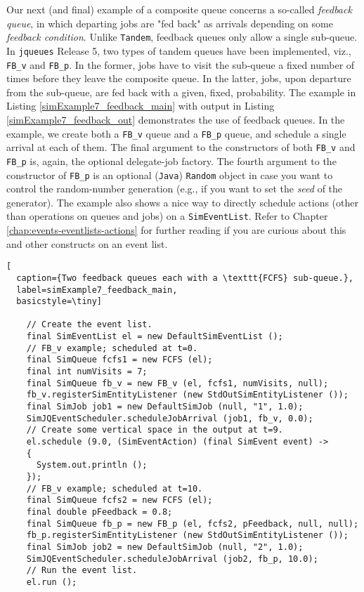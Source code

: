 Our next (and final) example of a composite queue
  concerns a so-called {\em feedback queue},
  in which departing jobs are "fed back"
  as arrivals depending on some {\em feedback condition}.
Unlike \lstinline|Tandem|,
  feedback queues only allow a single sub-queue.
In \lstinline|jqueues| Release 5,
  two types of tandem queues have been implemented,
  viz., \lstinline|FB_v| and \lstinline|FB_p|.
In the former, jobs have to visit the sub-queue a fixed number
  of times before they leave the composite queue.
In the latter, jobs, upon departure from the sub-queue,
  are fed back with a given, fixed, probability.
The example in Listing \ref{simExample7_feedback_main}
  with output in Listing \ref{simExample7_feedback_out}
  demonstrates the use of feedback queues.
In the example,
  we create both a \lstinline|FB_v| queue
  and a \lstinline|FB_p| queue,
  and schedule a single arrival at each of them.
The final argument to the constructors of
  both \lstinline|FB_v| and \lstinline|FB_p|
  is, again, the optional delegate-job factory.
The fourth argument to the constructor of \lstinline|FB_p|
  is an optional (\lstinline|Java|) \lstinline|Random| object
  in case you want to control the random-number generation
  (e.g., if you want to set the {\em seed\/} of the generator).
The example also shows a nice way
  to directly schedule actions
  (other than operations on queues and jobs)
  on a \lstinline|SimEventList|.
Refer to Chapter \ref{chap:events-eventlists-actions} for further reading
  if you are curious about this and other constructs on an event list.

\begin{lstfloat}
\begin{lstlisting}[
  caption={Two feedback queues each with a \texttt{FCFS} sub-queue.},
  label=simExample7_feedback_main,
  basicstyle=\tiny]

    // Create the event list.
    final SimEventList el = new DefaultSimEventList ();
    // FB_v example; scheduled at t=0.
    final SimQueue fcfs1 = new FCFS (el);
    final int numVisits = 7;
    final SimQueue fb_v = new FB_v (el, fcfs1, numVisits, null);
    fb_v.registerSimEntityListener (new StdOutSimEntityListener ());
    final SimJob job1 = new DefaultSimJob (null, "1", 1.0);
    SimJQEventScheduler.scheduleJobArrival (job1, fb_v, 0.0);
    // Create some vertical space in the output at t=9.
    el.schedule (9.0, (SimEventAction) (final SimEvent event) ->
    {
      System.out.println ();
    });
    // FB_v example; scheduled at t=10.
    final SimQueue fcfs2 = new FCFS (el);
    final double pFeedback = 0.8;
    final SimQueue fb_p = new FB_p (el, fcfs2, pFeedback, null, null);
    fb_p.registerSimEntityListener (new StdOutSimEntityListener ());
    final SimJob job2 = new DefaultSimJob (null, "2", 1.0);
    SimJQEventScheduler.scheduleJobArrival (job2, fb_p, 10.0);
    // Run the event list.
    el.run ();

\end{lstlisting}
\end{lstfloat}

